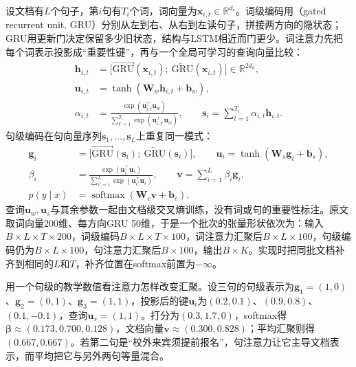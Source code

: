 设文档有$L$个句子，第$i$句有$T_i$个词，词向量为$\bm x_{i,t}\in\mathbb R^{d_e}$。词级编码用（gated recurrent unit, GRU）分别从左到右、从右到左读句子，拼接两方向的隐状态\cite{cho2014}；GRU用更新门决定保留多少旧状态，结构与LSTM相近而门更少。词注意力先把每个词表示投影成“重要性键”，再与一个全局可学习的查询向量比较：
\begin{equation}
  \label{eq:nlp-classification-han-word}
  \begin{aligned}
    \bm h_{i,t}&=\bigl[\overrightarrow{\mathrm{GRU}}(\bm x_{i,t});\ \overleftarrow{\mathrm{GRU}}(\bm x_{i,t})\bigr]\in\mathbb R^{2d_h},\\
    \bm u_{i,t}&=\tanh(\bm W_w\bm h_{i,t}+\bm b_w),\\
    \alpha_{i,t}&=\frac{\exp(\bm u_{i,t}^\top\bm u_w)}{\sum_{t'=1}^{T_i}\exp(\bm u_{i,t'}^\top\bm u_w)},\qquad
    \bm s_i=\sum_{t=1}^{T_i}\alpha_{i,t}\bm h_{i,t}.
  \end{aligned}
\end{equation}
句级编码在句向量序列$\bm s_1,\ldots,\bm s_L$上重复同一模式：
\begin{equation}
  \label{eq:nlp-classification-han-sentence}
  \begin{aligned}
    \bm g_i&=\bigl[\overrightarrow{\mathrm{GRU}}(\bm s_i);\ \overleftarrow{\mathrm{GRU}}(\bm s_i)\bigr],\qquad
    \bm u_i=\tanh(\bm W_s\bm g_i+\bm b_s),\\
    \beta_i&=\frac{\exp(\bm u_i^\top\bm u_s)}{\sum_{i'=1}^{L}\exp(\bm u_{i'}^\top\bm u_s)},\qquad
    \bm v=\sum_{i=1}^{L}\beta_i\bm g_i,\\
    p(y\mid x)&=\operatorname{softmax}(\bm W_c\bm v+\bm b_c).
  \end{aligned}
\end{equation}
查询$\bm u_w,\bm u_s$与其余参数一起由文档级交叉熵训练，没有词或句的重要性标注。原文取词向量200维、每方向GRU 50维，于是一个批次的张量形状依次为：输入$B\times L\times T\times200$，词级编码$B\times L\times T\times100$，词注意力汇聚后$B\times L\times100$，句级编码仍为$B\times L\times100$，句注意力汇聚后$B\times100$，输出$B\times K$。实现时把同批文档补齐到相同的$L$和$T$，补齐位置在softmax前置为$-\infty$。

用一个句级的教学数值看注意力怎样改变汇聚。设三句的句级表示为$\bm g_1=(1,0)$、$\bm g_2=(0,1)$、$\bm g_3=(1,1)$，投影后的键$\bm u_i$为$(0.2,0.1)$、$(0.9,0.8)$、$(0.1,-0.1)$，查询$\bm u_s=(1,1)$。打分为$(0.3,1.7,0)$，softmax得$\bm\beta\approx(0.173,0.700,0.128)$，文档向量$\bm v\approx(0.300,0.828)$；平均汇聚则得$(0.667,0.667)$。若第二句是“校外来宾须提前报名”，句注意力让它主导文档表示，而平均把它与另外两句等量混合。

